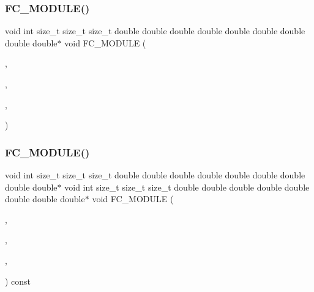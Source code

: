 \hypertarget{ViscidKernels_8H_abfc2b4c02899d1cd021cde740ed1c125}{}\label{ViscidKernels_8H_abfc2b4c02899d1cd021cde740ed1c125} 
\subsubsection{\texorpdfstring{F\+C\+\_\+\+M\+O\+D\+U\+L\+E()}{FC\_MODULE()}\hspace{0.1cm}{\footnotesize\ttfamily [2/4]}}
{\footnotesize\ttfamily void int size\+\_\+t size\+\_\+t size\+\_\+t double double double double double double double double double$\ast$ void F\+C\+\_\+\+M\+O\+D\+U\+LE (\begin{DoxyParamCaption}\item[{viscid}]{,  }\item[{viscidstronguniformflux}]{,  }\item[{V\+I\+S\+C\+ID}]{,  }\item[{V\+I\+S\+C\+I\+D\+S\+T\+R\+O\+N\+G\+U\+N\+I\+F\+O\+R\+M\+F\+L\+UX}]{ }\end{DoxyParamCaption})}

\hypertarget{ViscidKernels_8H_a5fe180053e1ad03853af7a0d4a2c6955}{}\label{ViscidKernels_8H_a5fe180053e1ad03853af7a0d4a2c6955} 
\subsubsection{\texorpdfstring{F\+C\+\_\+\+M\+O\+D\+U\+L\+E()}{FC\_MODULE()}\hspace{0.1cm}{\footnotesize\ttfamily [3/4]}}
{\footnotesize\ttfamily void int size\+\_\+t size\+\_\+t size\+\_\+t double double double double double double double double double$\ast$ void int size\+\_\+t size\+\_\+t size\+\_\+t double double double double double double double double$\ast$ void F\+C\+\_\+\+M\+O\+D\+U\+LE (\begin{DoxyParamCaption}\item[{viscid}]{,  }\item[{strongflux1d}]{,  }\item[{V\+I\+S\+C\+ID}]{,  }\item[{S\+T\+R\+O\+N\+G\+F\+L\+U\+X1D}]{ }\end{DoxyParamCaption}) const}

